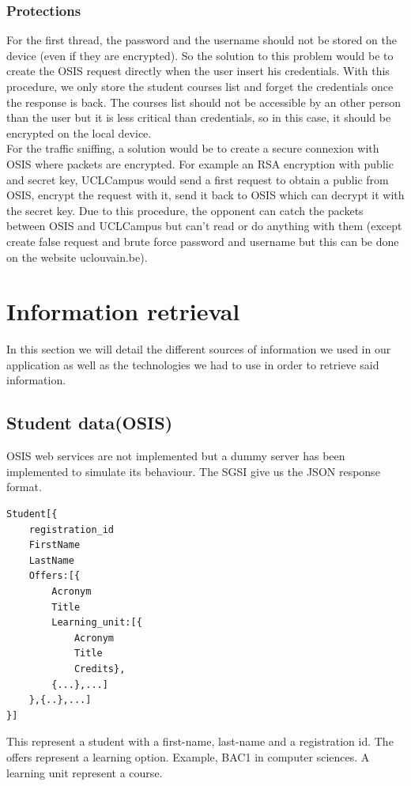 \documentclass{eplmastersthesis}
\begin{document}
\subsubsection{Protections}
For the first thread, the password and the username should not be stored on the device (even if they are encrypted). So the solution to this problem would be to create the OSIS request directly when the user insert his credentials. With this procedure, we only store the student courses list and forget the credentials once the response is back. The courses list should not be accessible by an other person than the user but it is less critical than credentials, so in this case, it should be encrypted on the local device. \\
For the traffic sniffing, a solution would be to create a secure connexion with OSIS where packets are encrypted. For example an RSA encryption with public and secret key, UCLCampus would send a first request to obtain a public from OSIS, encrypt the request with it, send it back to OSIS which can decrypt it with the secret key. Due to this procedure, the opponent can catch the packets between OSIS and UCLCampus but can't read or do anything with them (except create false request and brute force password and username but this can be done on the website uclouvain.be).
\section{Information retrieval}

In this section we will detail the different sources of information we used in our application as well as the technologies we had to use in order to retrieve said information. 
\subsection{Student data(OSIS)}

OSIS web services are not implemented but a dummy server has been implemented to simulate its behaviour. The SGSI give us the JSON response format.

\begin{verbatim}
Student[{
    registration_id
    FirstName
    LastName
    Offers:[{
        Acronym
        Title
        Learning_unit:[{
            Acronym
            Title
            Credits},
        {...},...]
    },{..},...]
}]
\end{verbatim}
This represent a student with a first-name, last-name and a registration id. The offers represent a learning option. Example, BAC1 in computer sciences. A learning unit represent a course. \\
\end{document}
